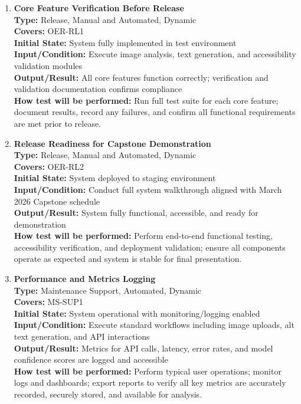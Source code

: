 \documentclass[12pt, titlepage]{article}
\begin{document}
\begin{enumerate}[label=NFR-ST \arabic*., wide=0pt, leftmargin=*]
  \item \textbf{Core Feature Verification Before Release} \\[2mm]
    \textbf{Type:} Release, Manual and Automated, Dynamic \\
    \textbf{Covers:} OER-RL1 \\
    \textbf{Initial State:} System fully implemented in test environment \\
    \textbf{Input/Condition:} Execute image analysis, text
    generation, and accessibility validation modules \\
    \textbf{Output/Result:} All core features function correctly;
    verification and validation documentation confirms compliance \\[2mm]
    \textbf{How test will be performed:}
    Run full test suite for each core feature; document results,
    record any failures, and confirm all functional requirements are
    met prior to release.

  \item \textbf{Release Readiness for Capstone Demonstration} \\[2mm]
    \textbf{Type:} Release, Manual and Automated, Dynamic \\
    \textbf{Covers:} OER-RL2 \\
    \textbf{Initial State:} System deployed to staging environment \\
    \textbf{Input/Condition:} Conduct full system walkthrough aligned
    with March 2026 Capstone schedule \\
    \textbf{Output/Result:} System fully functional, accessible, and
    ready for demonstration \\[2mm]
    \textbf{How test will be performed:}
    Perform end-to-end functional testing, accessibility
    verification, and deployment validation; ensure all components
    operate as expected and system is stable for final presentation.

  \item \textbf{Performance and Metrics Logging} \\[2mm]
    \textbf{Type:} Maintenance Support, Automated, Dynamic \\
    \textbf{Covers:} MS-SUP1 \\
    \textbf{Initial State:} System operational with
    monitoring/logging enabled \\
    \textbf{Input/Condition:} Execute standard workflows including
    image uploads, alt text generation, and API interactions \\
    \textbf{Output/Result:} Metrics for API calls, latency, error
    rates, and model confidence scores are logged and accessible \\[2mm]
    \textbf{How test will be performed:}
    Perform typical user operations; monitor logs and dashboards;
    export reports to verify all key metrics are accurately recorded,
    securely stored, and available for analysis.

\end{enumerate}
\end{document}
